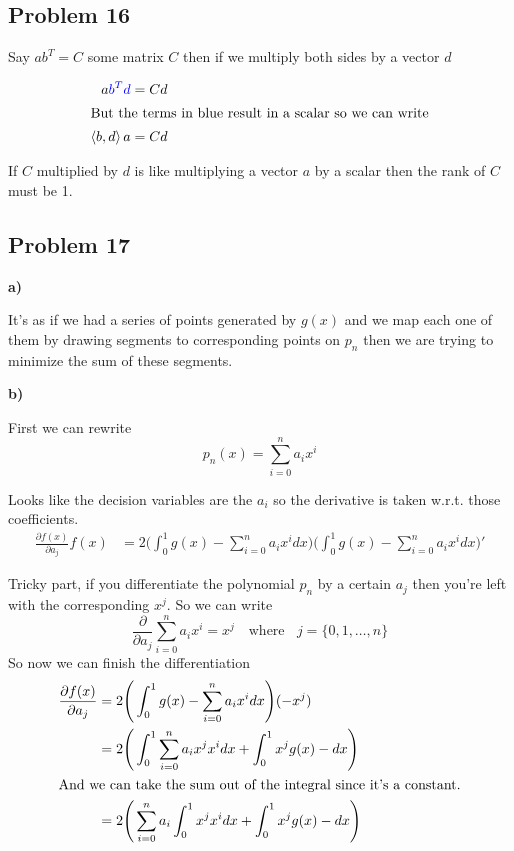 \subsection{Problem 16}

\answer

Say $ab^T = C$ some matrix $C$ then if we multiply both sides by a vector $d$

\begin{align*}
	a\textcolor{blue}{b^Td} = Cd	\\
\intertext{But the terms in blue result in a scalar so we can write}
	\left\langle b, d \right\rangle a = Cd
\end{align*}

If $C$ multiplied by $d$ is like multiplying a vector $a$ by a scalar then the rank of $C$ must be 1. 

\subsection{Problem 17}

\textbf{a)}

\answer

It's as if we had a series of points generated by $g(x)$ and we map each one of them by drawing segments to corresponding points on $p_n$ then we are trying to minimize the sum of these segments.

\textbf{b)}

\answer

First we can rewrite
\[
    p_n(x) = \sum_{i = 0}^{n}   a_i x^i
\]

Looks like the decision variables are the $a_i$ so the derivative is taken w.r.t. those coefficients.
\begin{align*}
    \frac{\partial f(x)}{\partial a_j} f(x) &= 2 \Bigg( \int_{0}^{1} g(x) - \sum_{i = 0}^{n}   a_i x^i dx \Bigg) \Bigg( \int_{0}^{1} g(x) - \sum_{i = 0}^{n}   a_i x^i dx \Bigg)'
\end{align*}

Tricky part, if you differentiate the polynomial $p_n$ by a certain $a_j$ then you're left with the corresponding $x^j$. So we can write
\[
    \frac{\partial}{\partial a_j} \sum_{i = 0}^{n}   a_i x^i = x^j \ \ \ \text{     where}\ \ \ \  j = \{0,1,\ldots,n\} 
\]
So now we can finish the differentiation
\begin{align*}
\frac{\partial f(x)}{\partial a_j} &= 2 \Bigg( \int_{0}^{1} g(x) - \sum_{i = 0}^{n}   a_i x^i dx \Bigg) (-x^j) \\
    &= 2 \Bigg( \int_{0}^{1} \sum_{i = 0}^{n}   a_i x^jx^i dx + \int_{0}^{1} x^j g(x) -  dx \Bigg) \\
\intertext{And we can take the sum out of the integral since it's a constant.}
    &= 2 \Bigg(  \sum_{i = 0}^{n}   a_i\int_{0}^{1} x^jx^i dx + \int_{0}^{1} x^j g(x) -  dx \Bigg)
\end{align*}

